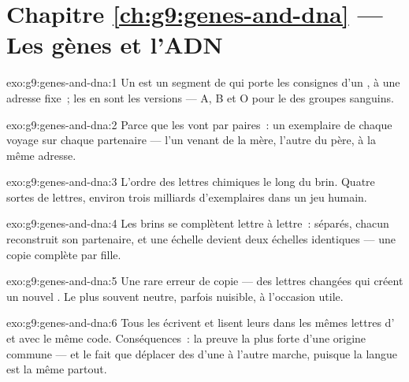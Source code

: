 \section*{Chapitre \ref{ch:g9:genes-and-dna} --- Les gènes et l'ADN}

\begin{solution}{exo:g9:genes-and-dna:1}
Un  est un segment de  qui porte les consignes
d'un , à une adresse fixe~; les  en sont les
versions --- A, B et O pour le  des groupes sanguins.
\end{solution}

\begin{solution}{exo:g9:genes-and-dna:2}
Parce que les  vont par paires~: un exemplaire de
chaque  voyage sur chaque partenaire --- l'un venant de
la mère, l'autre du père, à la même adresse.
\end{solution}

\begin{solution}{exo:g9:genes-and-dna:3}
L'ordre des lettres chimiques le long du brin. Quatre sortes
de lettres, environ trois milliards d'exemplaires dans un
jeu humain.
\end{solution}

\begin{solution}{exo:g9:genes-and-dna:4}
Les brins se complètent lettre à lettre~: séparés, chacun
reconstruit son partenaire, et une échelle devient deux
échelles identiques --- une copie complète par  fille.
\end{solution}

\begin{solution}{exo:g9:genes-and-dna:5}
Une rare erreur de copie --- des lettres changées qui créent
un nouvel . Le plus souvent neutre, parfois nuisible,
à l'occasion utile.
\end{solution}

\begin{solution}{exo:g9:genes-and-dna:6}
Tous les  écrivent et lisent leurs  dans
les mêmes lettres d' et avec le même code. Conséquences~:
la preuve la plus forte d'une origine commune --- et le fait
que déplacer des  d'une  à l'autre marche,
puisque la langue est la même partout.
\end{solution}

